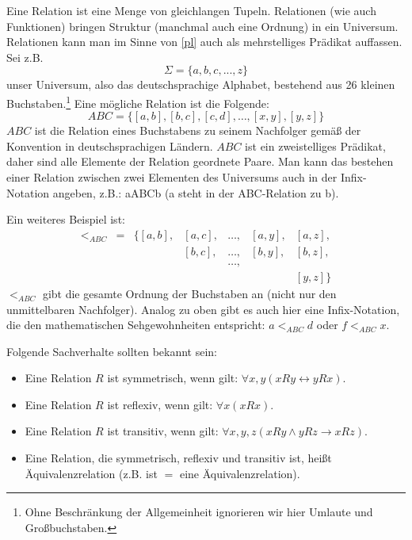Eine Relation ist eine Menge von gleichlangen Tupeln.
Relationen (wie auch Funktionen) bringen Struktur (manchmal auch eine Ordnung)
in ein Universum.
Relationen kann man im Sinne von \autoref{pl} auch als mehrstelliges Prädikat auffassen.
Sei z.B.
\[
    \Sigma = \{a,b,c,...,z\}
\]
unser Universum, also das deutschsprachige Alphabet,
bestehend aus 26 kleinen Buchstaben.\footnote{
Ohne Beschränkung der Allgemeinheit ignorieren wir hier Umlaute und Großbuchstaben.}
Eine mögliche Relation ist die Folgende:
\[
    ABC = \{[a,b], [b,c], [c,d], \ldots, [x,y], [y,z]\}
\]
$ABC$ ist die Relation eines Buchstabens zu seinem Nachfolger
gemäß der Konvention in deutschsprachigen Ländern.
$ABC$ ist ein zweistelliges Prädikat, daher sind alle Elemente der Relation geordnete Paare.
Man kann das bestehen einer Relation zwischen zwei Elementen des Universums
auch in der Infix-Notation angeben, z.B.: aABCb (a steht in der ABC-Relation zu b).

Ein weiteres Beispiel ist:
\[
    \begin{array}{lllllll}
        <_{ABC} &
        = &
            \{[a,b], &
            [a,c], &
            \ldots, &
            [a,y], &
            [a,z],\\
        &
        &
        &
            [b,c], &
            \ldots, &
            [b,y], &
            [b,z], \\
        &
        &
        &
        &
            \ldots,\\
        &
        &
        &
        &
        &
        &
            [y,z] \}
\end{array}
\]
$<_{ABC}$ gibt die gesamte Ordnung der Buchstaben an (nicht nur den unmittelbaren Nachfolger).
Analog zu oben gibt es auch hier eine Infix-Notation,
die den mathematischen Sehgewohnheiten entspricht: $a <_{ABC} d$ oder $f <_{ABC} x$.

\noindent
Folgende Sachverhalte sollten bekannt sein:
\begin{itemize}
    \item Eine Relation $R$ ist symmetrisch, wenn gilt: $\forall x,y(xRy \leftrightarrow yRx)$.
    \item Eine Relation $R$ ist reflexiv, wenn gilt: $\forall x(xRx)$.
    \item Eine Relation $R$ ist transitiv,
        wenn gilt: $\forall x,y,z(xRy \wedge yRz \rightarrow xRz)$.
    \item Eine Relation, die symmetrisch, reflexiv und transitiv ist,
          heißt Äquivalenzrelation (z.B. ist $=$ eine Äquivalenzrelation).
\end{itemize}

